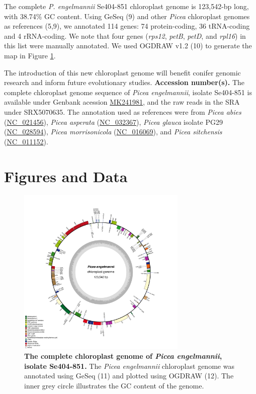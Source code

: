 \documentclass[titlepage,11pt, oneside]{article}   	%
\begin{document}
\newline
\par
The complete \textit{P. engelmannii} Se404-851 chloroplast genome is 123,542-bp long, with 38.74\% GC content. Using GeSeq (9) and other \textit{Picea} chloroplast genomes as references (5,9), we annotated 114 genes: 74 protein-coding, 36 tRNA-coding and 4 rRNA-coding. We note that four genes (\textit{rps12}, \textit{petB}, \textit{petD}, and \textit{rpl16}) in this list were manually annotated. We used OGDRAW v1.2 (10) to generate the map in Figure \ref{fig:ogdraw}.
\newline
\par
The introduction of this new chloroplast genome will benefit conifer genomic research and inform future evolutionary studies.
\newline
\newline
\textbf{Accession number(s).} The complete chloroplast genome sequence of \textit{Picea engelmannii}, isolate Se404-851 is available under Genbank acession \href{https://www.ncbi.nlm.nih.gov/nuccore/MK241981}{MK241981}, and the raw reads in the SRA under SRX5070635. The annotation used as references were from \textit{Picea abies} (\href{https://www.ncbi.nlm.nih.gov/nuccore/NC_021456}{NC\_021456}), \textit{Picea asperata} (\href{https://www.ncbi.nlm.nih.gov/nuccore/NC_032367}{NC\_032367}), \textit{Picea glauca} isolate PG29 (\href{https://www.ncbi.nlm.nih.gov/nuccore/NC_028594}{NC\_028594}), \textit{Picea morrisonicola} (\href{https://www.ncbi.nlm.nih.gov/nuccore/NC_016069}{NC\_016069}), and \textit{Picea sitchensis} (\href{https://www.ncbi.nlm.nih.gov/nuccore/NC_011152}{NC\_011152}).
\section*{Figures and Data}
\begin{figure}[h]
\centering
\includegraphics[width=0.72\textwidth]{Se404-851}
\caption{\textbf{The complete chloroplast genome of \textit{Picea engelmannii}, isolate Se404-851.} The \textit{Picea engelmannii} chloroplast genome was annotated using GeSeq (11) and plotted using OGDRAW (12). The inner grey circle illustrates the GC content of the genome.}
\label{fig:ogdraw}
\end{figure}
\end{document}
